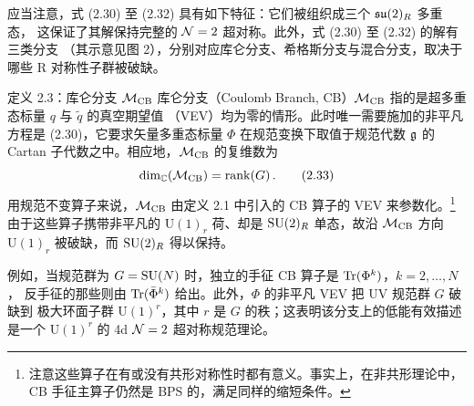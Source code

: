 应当注意，式 (2.30) 至 (2.32) 具有如下特征：它们被组织成三个 $\mathfrak{su}(2)_R$ 多重态，
这保证了其解保持完整的 $\mathcal{N}=2$ 超对称。此外，式 (2.30) 至 (2.32) 的解有三类分支
（其示意见图 2），分别对应库仑分支、希格斯分支与混合分支，取决于哪些 R 对称性子群被破缺。


\begin{definitionbox}{定义 2.3：库仑分支 $\mathcal{M}_{\mathrm{CB}}$}
  库仑分支（Coulomb Branch, CB）$\mathcal{M}_{\mathrm{CB}}$ 指的是超多重态标量 $q$ 与 $\tilde q$ 的真空期望值
  （VEV）均为零的情形。此时唯一需要施加的非平凡方程是 (2.30)，它要求矢量多重态标量
  $\Phi$ 在规范变换下取值于规范代数 $\mathfrak{g}$ 的 Cartan 子代数之中。相应地，$\mathcal{M}_{\mathrm{CB}}$
  的复维数为
  \begin{equation}
    \dim_{\mathbb{C}}(\mathcal{M}_{\mathrm{CB}})=\operatorname{rank}(G)\,.
    \tag{2.33}
  \end{equation}
  用规范不变算子来说，$\mathcal{M}_{\mathrm{CB}}$ 由定义 2.1 中引入的 CB 算子的 VEV 来参数化。\footnote{%
  注意这些算子在有或没有共形对称性时都有意义。事实上，在非共形理论中，CB 手征主算子仍然是
  BPS 的，满足同样的缩短条件。} 由于这些算子携带非平凡的 $\mathrm{U}(1)_r$ 荷、却是
  $\mathrm{SU}(2)_R$ 单态，故沿 $\mathcal{M}_{\mathrm{CB}}$ 方向 $\mathrm{U}(1)_r$ 被破缺，而 $\mathrm{SU}(2)_R$ 得以保持。
\end{definitionbox}

例如，当规范群为 $G=\mathrm{SU}(N)$ 时，独立的手征 CB 算子是 $\operatorname{Tr}(\Phi^k)$，$k=2,\dots,N$，
反手征的那些则由 $\operatorname{Tr}(\bar\Phi^k)$ 给出。此外，$\Phi$ 的非平凡 VEV 把 UV 规范群 $G$ 破缺到
极大环面子群 $\mathrm{U}(1)^r$，其中 $r$ 是 $G$ 的秩；这表明该分支上的低能有效描述是一个
$\mathrm{U}(1)^r$ 的 4d $\mathcal{N}=2$ 超对称规范理论。

